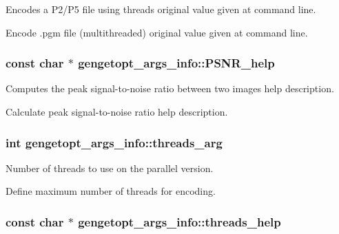 Encodes a P2/\+P5 file using threads original value given at command line. 

Encode .pgm file (multithreaded) original value given at command line. \hypertarget{structgengetopt__args__info_a8cc1db291d64a0a1885e4064e74b547f}{}
\subsubsection[{P\+S\+N\+R\+\_\+help}]{\setlength{\rightskip}{0pt plus 5cm}const char $\ast$ gengetopt\+\_\+args\+\_\+info\+::\+P\+S\+N\+R\+\_\+help}\label{structgengetopt__args__info_a8cc1db291d64a0a1885e4064e74b547f}


Computes the peak signal-\/to-\/noise ratio between two images help description. 

Calculate peak signal-\/to-\/noise ratio help description. \hypertarget{structgengetopt__args__info_a691cdcfa9efb6faa4f508d2884baccd4}{}
\subsubsection[{threads\+\_\+arg}]{\setlength{\rightskip}{0pt plus 5cm}int gengetopt\+\_\+args\+\_\+info\+::threads\+\_\+arg}\label{structgengetopt__args__info_a691cdcfa9efb6faa4f508d2884baccd4}


Number of threads to use on the parallel version. 

Define maximum number of threads for encoding. \hypertarget{structgengetopt__args__info_a55ec6fc3721645b1c1203217fa40f32c}{}
\subsubsection[{threads\+\_\+help}]{\setlength{\rightskip}{0pt plus 5cm}const char $\ast$ gengetopt\+\_\+args\+\_\+info\+::threads\+\_\+help}\label{structgengetopt__args__info_a55ec6fc3721645b1c1203217fa40f32c}


